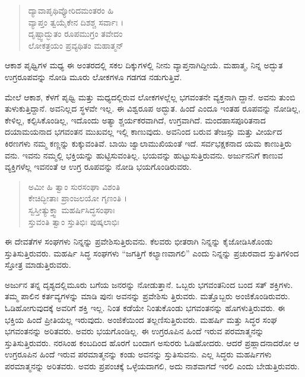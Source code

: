 \begin{verse}
ದ್ಯಾವಾಪೃಥಿವ್ಯೋರಿದಮಂತರಂ ಹಿ \\ ವ್ಯಾಪ್ತಂ ತ್ವಯೈಕೇನ ದಿಶಶ್ಚ ಸರ್ವಾಃ ।\\ದೃಷ್ಟ್ವಾದ್ಭುತಂ ರೂಪಮುಗ್ರಂ ತವೇದಂ \\ ಲೋಕತ್ರಯಂ ಪ್ರವ್ಯಥಿತಂ ಮಹಾತ್ಮನ್ 
\end{verse}

{\small ಆಕಾಶ ಪೃಥ್ವಿಗಳ ಮಧ್ಯ ಈ ಅಂತರದಲ್ಲಿ ಸಕಲ ದಿಕ್ಕುಗಳಲ್ಲಿ ನೀನು ವ್ಯಾಪ್ತನಾಗಿದ್ದೀಯೆ. ಮಹಾತ್ಮ, ನಿನ್ನ ಅದ್ಭುತ ಉಗ್ರರೂಪವನ್ನು ನೋಡಿ ಮೂರು ಲೋಕಗಳೂ ಗಡಗಡ ನಡುಗುತ್ತಿವೆ.}

ಮೇಲೆ ಆಕಾಶ, ಕೆಳಗೆ ಪೃಥ್ವಿ ಮತ್ತು ಮಧ್ಯದಲ್ಲಿರುವ ಲೋಕಗಳಲ್ಲೆಲ್ಲ ಭಗವಂತನೇ ವ್ಯಕ್ತನಾಗಿ ದ್ದಾನೆ. ಅವನು ತುಂಬಿ ತುಳುಕುತ್ತಿದ್ದಾನೆ. ಅವನಿಲ್ಲದ ಸ್ಥಳವೇ ಇಲ್ಲ. ಈ ವಿಶ್ವರೂಪ ಅದ್ಭುತ. ಹಿಂದೆ ಎಂದೂ ಇಂತಹ ರೂಪವನ್ನು ನೋಡಿಲ್ಲ, ಕೇಳಿಲ್ಲ, ಕಲ್ಪಿಸಿಕೊಂಡಿಲ್ಲ, ಇದೊಂದು ಅತ್ಯಾ ಶ್ಚರ್ಯಕರವಾಗಿದೆ, ಉಗ್ರವಾಗಿದೆ. ಮಂದಹಾಸಪೂರಿತನಾದ ದಯಾಮಯನಾದ ಭಗವಂತನ ಮುಖವಲ್ಲ ಇಲ್ಲಿ ಕಾಣುವುದು. ಅವನಿಂದ ಬರುವ ತೇಜಸ್ಸು ಮತ್ತು ವೀರ್ಯದ ಕಿರಣಗಳು ನಮ್ಮ ಕಣ್ಣನ್ನು ಕುಕ್ಕುವಂತಿವೆ. ಬಾಯಿ ಜ್ವಾಲಾಮುಖಿಯಂತೆ ಇದೆ. ಸರ್ವಭಕ್ಷಕನಾದ ಯಮ ಕಾಣುತ್ತಿರು ವನು. ಇವನು ನಮ್ಮಲ್ಲಿ ಭಕ್ತಿಯನ್ನು ಹುಟ್ಟಿಸುವಂತಿಲ್ಲ. ಭಯವನ್ನು ಹುಟ್ಟುಸುತ್ತಿರುವನು. ಅರ್ಜುನನಿಗೆ ಕಾಣುವ ವ್ಯಕ್ತಿಗಳೆಲ್ಲ ಇವನಂತೆ ಆ ಉಗ್ರ ರೂಪವನ್ನು ನೋಡಿ ಭಯಗೊಂಡಿರುವರು.

\begin{verse}
ಅಮೀ ಹಿ ತ್ವಾಂ ಸುರಸಂಘಾ ವಿಶಂತಿ \\ ಕೇಚಿದ್ಭೀತಾಃ ಪ್ರಾಂಜಲಯೋ ಗೃಣಂತಿ ।\\ಸ್ವಸ್ತೀತ್ಯುಕ್ತ್ವಾ ಮಹರ್ಷಿಸಿದ್ಧಸಂಘಾಃ \\ ಸ್ತುವಂತಿ ತ್ವಾಂ ಸ್ತುತಿಭಿಃ ಪುಷ್ಕಲಾಭಿಃ 
\end{verse}

{\small ಈ ದೇವತೆಗಳ ಸಂಘಗಳು ನಿನ್ನನ್ನು ಪ್ರವೇಶಿಸುತ್ತಿರುವನು. ಕೆಲವರು ಭೀತರಾಗಿ ನಿನ್ನನ್ನು ಕೈಜೋಡಿಸಿಕೊಂಡು ಸ್ತುತಿಸುತ್ತಿರುವರು. ಮಹರ್ಷಿ ಸಿದ್ಧ ಸಂಘಗಳು “ಜಗತ್ತಿಗೆ ಕಲ್ಯಾಣವಾಗಲಿ” ಎಂದು ನಿನ್ನನ್ನು ಪ್ರಚುರವಾದ ಸ್ತುತಿಗಳಿಂದ ಸ್ತೋತ್ರ ಮಾಡುತ್ತಿರುವರು.}

ಅರ್ಜುನ ತನ್ನ ದೃಶ್ಯದಲ್ಲಿಮೂರು ಬಗೆಯ ಜನರನ್ನು ನೋಡುತ್ತಾನೆ. ಒಬ್ಬರು ಭಗವಂತನಿಂದ ಬಂದ ಸತ್ ಶಕ್ತಿಗಳು. ತಮ್ಮ ಪಾಲಿನ ಕರ್ತವ್ಯಗಳನ್ನು ಮಾಡಿ ಪುನಃ ಅವನನ್ನು ಪ್ರವೇಶಿಸು ತ್ತಿರುವರು. ಮತ್ತೊಬ್ಬರು ಅಂಜಿಕೊಂಡಿರುವರು. ಓಡಿಹೋಗುವುದಕ್ಕೆ ಅವರಿಗೆ ಶಕ್ತಿ ಇಲ್ಲ. ನಿಂತ ಕಡೆಯೇ ನಿಂತುಕೊಂಡು ಭಗವಂತನನ್ನು ಹೊಗಳುತ್ತಿರುವರು. ಈ ಭಕ್ತಿಯ ಹಿಂದೆ ಪ್ರೀತಿಯಲ್ಲ ಇರುವುದು. ಅಂಜಿಕೆಯಿಂದ ತಲ್ಲಣಿಸುತ್ತಿರುವರು. ಮಹರ್ಷಿ ಮತ್ತು ಸಿದ್ಧರ ಸಂಘ ಭಗವಂತನನ್ನು ಅರಿತವರು. ಅವರು ಭಯಗೊಂಡಿಲ್ಲ. ಈ ಉಗ್ರರೂಪಿನ ಹಿಂದೆ ಇರುವ ಪರಮಾತ್ಮನನ್ನು ಸ್ತುತಿಸುತ್ತಿರುವರು. ನರಸಿಂಹ ಕಂಬದಿಂದ ಹೊರಗೆ ಬಂದಾಗ ಅಸುರರು ಓಡಿಹೋದರು. ಆದರೆ ಪ್ರಹ್ಲಾದನಾದರೋ ಆ ಉಗ್ರರೂಪಿನ ಹಿಂದೆ ಇರುವ ಪರಮಾತ್ಮನನ್ನು ಕಂಡು ಅವನನ್ನು ಸ್ತುತಿಸುವನು. ಎಲ್ಲ ಸಿದ್ಧರು ಮಹರ್ಷಿಗಳು ಪರಮಾತ್ಮನನ್ನು ಅರಿತವರು. ಅವರು ಪ್ರಪಂಚಕ್ಕೆ ಒಳ್ಳೆಯದಾಗಲಿ, ಅದು ನಾಶವಾಗದೆ ಇರಲಿ ಎಂದು ಬೇಡುತ್ತಿರುವರು.


